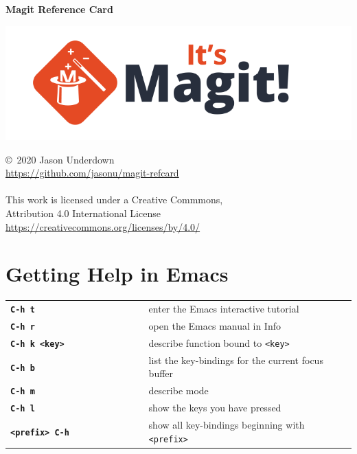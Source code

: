 \documentclass[9pt]{extarticle} %
\renewcommand{\title}[1]
{{\normalfont\sffamily\huge\bfseries #1}\vspace{1ex}}
\begin{document}
\begin{multicols}{3}

  \title{Magit Reference Card}

  \includegraphics[scale=0.25]{magit.png}

  {\small
    \copyright\ 2020 Jason Underdown \\
    \url{https://github.com/jasonu/magit-refcard}\\ \\
    This work is licensed under a Creative Commmons, \\
    Attribution 4.0 International License \\
    \url{https://creativecommons.org/licenses/by/4.0/}
  }

  \vspace{3ex}

  \section*{Getting Help in Emacs}

  \renewcommand{\arraystretch}{1.3}
  \begin{tabular}{L{0.40\linewidth} L{0.60\linewidth}}
    \tt \textbf{C-h t}
    & enter the Emacs interactive tutorial \\
    \tt \textbf{C-h r}
    & open the Emacs manual in Info \\
    \tt \textbf{C-h k <key>}
    & describe function bound to \texttt{<key>}  \\
    \tt \textbf{C-h b}
    & list the key-bindings for the current focus buffer \\
    \tt \textbf{C-h m}
    & describe mode \\
    \tt \textbf{C-h l}
    & show the keys you have pressed \\
    \tt \textbf{<prefix> C-h}
    & show all key-bindings beginning with \texttt{<prefix>}
  \end{tabular}



\end{multicols}
\end{document}
